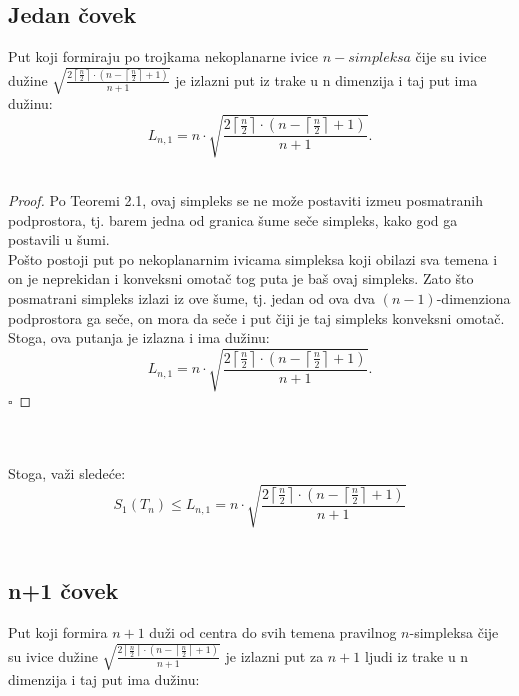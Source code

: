 \documentclass[11pt,letter]{article}
\begin{document}
\subsection[Jedan \v covek]{Jedan \v covek}
\bigskip
\teo Put koji formiraju po trojkama nekoplanarne ivice $n-simpleksa$ \v cije su ivice du\v zine $\sqrt{\frac{2\left\lceil \frac{n}{2}\right\rceil\cdot \left( n-\left\lceil\frac{n}{2}\right\rceil+1\right)}{n+1}}$ je izlazni put iz trake u n dimenzija i taj put ima du\v zinu:
$$L_{n,1}=n\cdot \sqrt{\frac{2\left\lceil \frac{n}{2}\right\rceil\cdot \left( n-\left\lceil\frac{n}{2}\right\rceil+1\right)}{n+1}}.$$
\\
\smallskip
\begin{proof}
Po Teoremi 2.1, ovaj simpleks se ne mo\v ze postaviti izme\dj u posmatranih podprostora, tj. barem jedna od granica \v sume se\v ce simpleks, kako god ga postavili u \v sumi.
\\
\indent Po\v sto postoji put po nekoplanarnim ivicama simpleksa koji obilazi sva temena i on je neprekidan i konveksni omota\v c tog puta je ba\v s ovaj simpleks. Zato \v sto posmatrani simpleks izlazi iz ove \v sume, tj. jedan od ova dva $(n-1)$-dimenziona podprostora ga se\v ce, on mora da se\v ce i put \v ciji je taj simpleks konveksni omota\v c. Stoga, ova putanja je izlazna i ima du\v zinu:
$$L_{n,1}=n\cdot \sqrt{\frac{2\left\lceil \frac{n}{2}\right\rceil\cdot \left( n-\left\lceil\frac{n}{2}\right\rceil+1\right)}{n+1}}.$$
$\square$
\end{proof}
\\
\\
Stoga, va\v zi slede\' ce:
$$S_1(T_n)\leqslant L_{n, 1}=n\cdot \sqrt{\frac{2\left\lceil \frac{n}{2}\right\rceil\cdot \left( n-\left\lceil\frac{n}{2}\right\rceil+1\right)}{n+1}}$$
\\
\smallskip
\subsection[n+1 \v covek]{n+1 \v covek} 
\bigskip
\teo Put koji formira $n+1$ du\v zi od centra do svih temena pravilnog $n$-simpleksa  \v cije su ivice du\v zine $\sqrt{\frac{2\left\lceil \frac{n}{2}\right\rceil\cdot \left( n-\left\lceil\frac{n}{2}\right\rceil+1\right)}{n+1}}$ je izlazni put za $n+1$ ljudi iz trake u n dimenzija i taj put ima du\v zinu:
\end{document}
